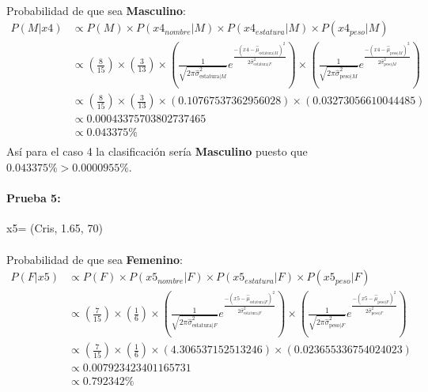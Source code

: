 \documentclass[12pt]{article}
\begin{document}
\paragraph{}Probabilidad de que sea \textbf{Masculino}:\\
\begin{equation}
\begin{split}
P(M|x4) &\propto P(M) \times P(x4_{nombre}|M) \times P(x4_{estatura}|M) \times P(x4_{peso}|M) \\
&\propto (\frac{8}{15}) \times (\frac{3}{13}) \times (\frac{1}{\sqrt{2\pi\hat{\sigma}_{\text{estatura}|M}^2}}e^{\frac{-(x4 - \hat{\mu}_{\text{estatura}|M})^2}{2\hat{\sigma}_{\text{estatura}|F}^2}}) \times (\frac{1}{\sqrt{2\pi\hat{\sigma}_{\text{peso}|M}^2}}e^{\frac{-(x4 - \hat{\mu}_{\text{peso}|M})^2}{2\hat{\sigma}_{\text{peso}|M}^2}}) \\
&\propto (\frac{8}{15}) \times (\frac{3}{13}) \times (0.10767537362956028) \times (0.03273056610044485) \\
&\propto 0.00043375703802737465 \\
&\propto 0.043375 \% \\
\end{split}
\end{equation}
Así para el caso 4 la clasificación sería \textbf{Masculino} puesto que $0.043375\% > 0.0000955\%$.\\
\clearpage
\pagebreak
\paragraph{Prueba 5: }x5= (Cris, 1.65, 70)
\paragraph{}Probabilidad de que sea \textbf{Femenino}:\\
\begin{equation}
\begin{split}
P(F|x5) &\propto P(F) \times P(x5_{nombre}|F) \times P(x5_{estatura}|F) \times P(x5_{peso}|F) \\
&\propto (\frac{7}{15}) \times (\frac{1}{6}) \times (\frac{1}{\sqrt{2\pi\hat{\sigma}_{\text{estatura}|F}^2}}e^{\frac{-(x5 - \hat{\mu}_{\text{estatura}|F})^2}{2\hat{\sigma}_{\text{estatura}|F}^2}}) \times (\frac{1}{\sqrt{2\pi\hat{\sigma}_{\text{peso}|F}^2}}e^{\frac{-(x5 - \hat{\mu}_{\text{peso}|F})^2}{2\hat{\sigma}_{\text{peso}|F}^2}}) \\
&\propto (\frac{7}{15}) \times (\frac{1}{6}) \times (4.306537152513246) \times (0.023655336754024023) \\
&\propto 0.007923423401165731 \\
&\propto 0.792342\% \\
\end{split}
\end{equation}
\end{document}
